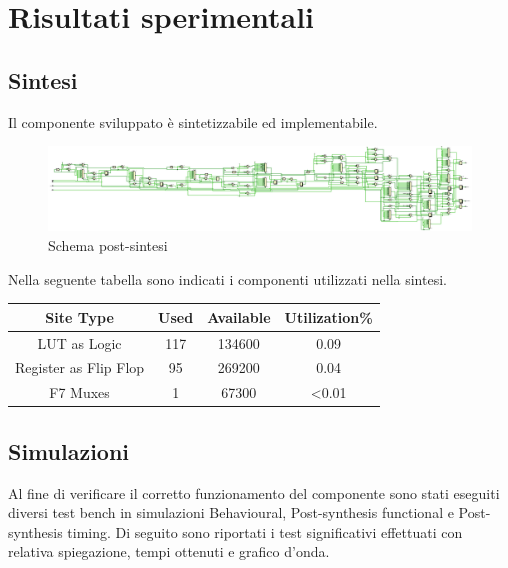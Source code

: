 \documentclass{article}
\begin{document}
\section{Risultati sperimentali}
\subsection{Sintesi}
Il componente sviluppato è sintetizzabile ed implementabile. 
\begin{figure}[H]
	\centering
	\includegraphics[width=1\textwidth]{Assets/schematic.eps}
	\caption{Schema post-sintesi}
\end{figure}
Nella seguente tabella sono indicati i componenti utilizzati nella sintesi.
\begin{center}
	\begin{tabular}{c|c|c|c}
		
		Site Type   & Used & Available & Utilization\% \\
		\hline
		LUT as Logic & 117 & 134600 & 0.09 \\
		
		Register as Flip Flop & 95 & 269200  & 0.04\\
		
		F7 Muxes & 1 & 67300 & <0.01\\
		
	\end{tabular}
\end{center}



\subsection{Simulazioni}
Al fine di verificare il corretto funzionamento del componente sono stati eseguiti diversi test bench in simulazioni Behavioural, Post-synthesis functional e Post-synthesis timing. 
Di seguito sono riportati i test significativi effettuati con relativa spiegazione, tempi ottenuti e grafico d'onda.
\end{document}
